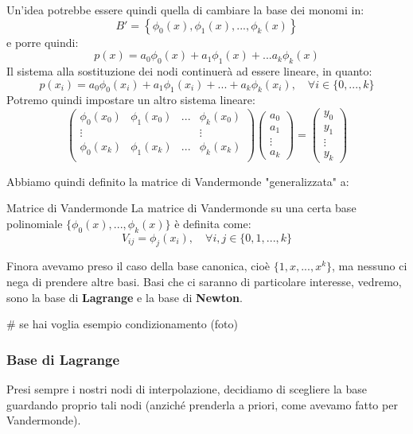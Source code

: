 \documentclass[a4paper,11pt]{article}
\begin{document}
Un'idea potrebbe essere quindi quella di cambiare la base dei monomi in:
$$
B' = \left\{ \phi_0(x), \phi_1(x), ..., \phi_k(x) \right\}
$$
e porre quindi:
$$
p(x) = a_0 \phi_0(x) + a_1 \phi_1(x) + ... a_k \phi_k(x)
$$
Il sistema alla sostituzione dei nodi continuerà ad essere lineare, in quanto:
$$
p(x_i) = a_0 \phi_0(x_i) + a_1 \phi_1(x_i) + ... + a_k \phi_k(x_i), \quad \forall i \in \{ 0, ..., k \}
$$
Potremo quindi impostare un altro sistema lineare:
$$
\begin{pmatrix}
	\phi_0(x_0) & \phi_1(x_0) & ... & \phi_k(x_0) \\ 
	\vdots & & & \vdots \\
	\phi_0(x_k) & \phi_1(x_k) & ... & \phi_k(x_k) \\ 
\end{pmatrix}
\begin{pmatrix}
	a_0 \\ a_1 \\ \vdots \\ a_k
\end{pmatrix}
=
\begin{pmatrix}
	y_0 \\ y_1 \\ \vdots \\ y_k
\end{pmatrix}
$$

Abbiamo quindi definito la matrice di Vandermonde "generalizzata" a:
\begin{definition}{Matrice di Vandermonde}
	La matrice di Vandermonde su una certa base polinomiale $\{\phi_0(x), ..., \phi_k(x)\}$ è definita come:
$$
V_{ij} = \phi_j(x_i), \quad \forall i, j \in \{0, 1, ..., k\}
$$
\end{definition}
Finora avevamo preso il caso della base canonica, cioè $\{1, x, ..., x^k\}$, ma nessuno ci nega di prendere altre basi.
Basi che ci saranno di particolare interesse, vedremo, sono la base di \textbf{Lagrange} e la base di \textbf{Newton}.

# se hai voglia esempio condizionamento (foto)

\subsubsection{Base di Lagrange}
Presi sempre i nostri nodi di interpolazione, decidiamo di scegliere la base guardando proprio tali nodi (anziché prenderla a priori, come avevamo fatto per Vandermonde).
\end{document}
